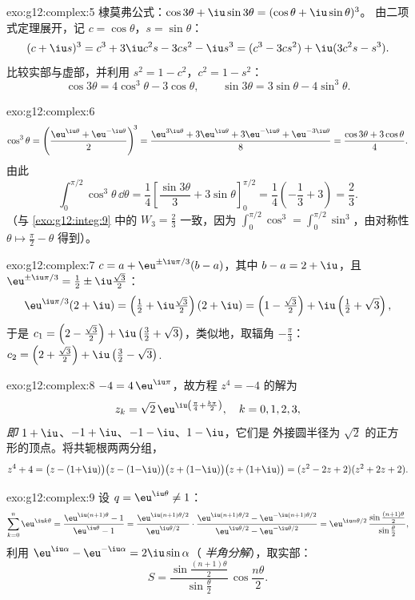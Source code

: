 \begin{solution}{exo:g12:complex:5}
棣莫弗公式：$\cos3\theta + \iu\sin3\theta = (\cos\theta + \iu\sin\theta)^3$。
由二项式定理展开，记 $c = \cos\theta$，$s = \sin\theta$：
\[
(c + \iu s)^3 = c^3 + 3\iu c^2 s - 3 c s^2 - \iu s^3
= (c^3 - 3cs^2) + \iu(3c^2 s - s^3).
\]
比较实部与虚部，并利用 $s^2 = 1 - c^2$，$c^2 = 1 - s^2$：
\[
\cos3\theta = 4\cos^3\theta - 3\cos\theta,
\qquad
\sin3\theta = 3\sin\theta - 4\sin^3\theta .
\]
\end{solution}

\begin{solution}{exo:g12:complex:6}
\[
\cos^3\theta = \left(\frac{\eu^{\iu\theta} + \eu^{-\iu\theta}}{2}\right)^{\!3}
= \frac{\eu^{3\iu\theta} + 3\eu^{\iu\theta} + 3\eu^{-\iu\theta} + \eu^{-3\iu\theta}}{8}
= \frac{\cos3\theta + 3\cos\theta}{4}.
\]
由此
\[
\int_0^{\pi/2}\cos^3\theta\,\dd\theta
= \frac14\left[\frac{\sin3\theta}{3} + 3\sin\theta\right]_0^{\pi/2}
= \frac14\left(-\frac13 + 3\right) = \frac{2}{3}.
\]
（与 \cref{exo:g12:integ:9} 中的 $W_3 = \frac23$ 一致，因为
$\int_0^{\pi/2}\cos^3 = \int_0^{\pi/2}\sin^3$，由对称性
$\theta \mapsto \frac\pi2 - \theta$ 得到）。
\end{solution}

\begin{solution}{exo:g12:complex:7}
$c = a + \eu^{\pm\iu\pi/3}(b - a)$，其中 $b - a = 2 + \iu$，且
$\eu^{\pm\iu\pi/3} = \frac12 \pm \iu\frac{\sqrt3}{2}$：
\[
\eu^{\iu\pi/3}(2+\iu) = \left(\tfrac12 + \iu\tfrac{\sqrt3}{2}\right)(2+\iu)
= \left(1 - \tfrac{\sqrt3}{2}\right) + \iu\left(\tfrac12 + \sqrt3\right),
\]
于是 $c_1 = \left(2 - \frac{\sqrt3}{2}\right) +
\iu\left(\frac32 + \sqrt3\right)$，类似地，取辐角
$-\frac\pi3$：
$c_2 = \left(2 + \frac{\sqrt3}{2}\right) + \iu\left(\frac32 - \sqrt3\right)$.
\end{solution}

\begin{solution}{exo:g12:complex:8}
$-4 = 4\,\eu^{\iu\pi}$，故方程 $z^4 = -4$ 的解为
\[
z_k = \sqrt2\,\eu^{\iu\left(\frac\pi4 + \frac{k\pi}{2}\right)},
\quad k = 0, 1, 2, 3,
\]
\emph{即} $1 + \iu$、$-1 + \iu$、$-1 - \iu$、$1 - \iu$，它们是
外接圆半径为 $\sqrt 2$ 的正方形的顶点。将共轭根两两分组，
\[
z^4 + 4 = \bigl(z - (1{+}\iu)\bigr)\bigl(z - (1{-}\iu)\bigr)
\bigl(z + (1{-}\iu)\bigr)\bigl(z + (1{+}\iu)\bigr)
= (z^2 - 2z + 2)(z^2 + 2z + 2).
\]
\end{solution}

\begin{solution}{exo:g12:complex:9}
设 $q = \eu^{\iu\theta} \neq 1$：
\[
\sum_{k=0}^{n} \eu^{\iu k\theta} = \frac{\eu^{\iu(n+1)\theta} - 1}{\eu^{\iu\theta} - 1}
= \frac{\eu^{\iu(n+1)\theta/2}}{\eu^{\iu\theta/2}}
\cdot\frac{\eu^{\iu(n+1)\theta/2} - \eu^{-\iu(n+1)\theta/2}}{\eu^{\iu\theta/2} - \eu^{-\iu\theta/2}}
= \eu^{\iu n\theta/2}\,
\frac{\sin\frac{(n+1)\theta}{2}}{\sin\frac{\theta}{2}},
\]
利用 $\eu^{\iu\alpha} - \eu^{-\iu\alpha} = 2\iu\sin\alpha$（
\emph{半角分解}），取实部：
\[
S = \frac{\sin\frac{(n+1)\theta}{2}}{\sin\frac{\theta}{2}}\,
\cos\frac{n\theta}{2}.
\]
\end{solution}

